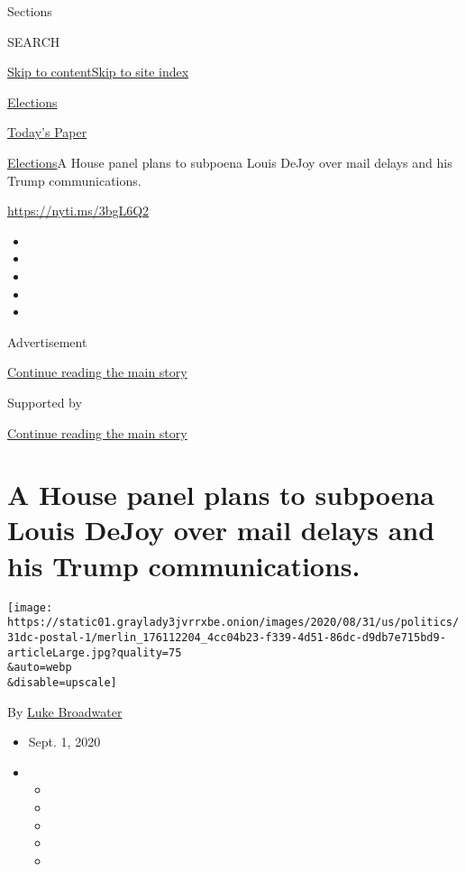 Sections

SEARCH

\protect\hyperlink{site-content}{Skip to
content}\protect\hyperlink{site-index}{Skip to site index}

\href{https://www.nytimes3xbfgragh.onion/news-event/2020-election}{Elections}

\href{https://myaccount.nytimes3xbfgragh.onion/auth/login?response_type=cookie\&client_id=vi}{}

\href{https://www.nytimes3xbfgragh.onion/section/todayspaper}{Today's
Paper}

\href{/news-event/2020-election}{Elections}\textbar{}A House panel plans
to subpoena Louis DeJoy over mail delays and his Trump communications.

\url{https://nyti.ms/3bgL6Q2}

\begin{itemize}
\item
\item
\item
\item
\item
\end{itemize}

Advertisement

\protect\hyperlink{after-top}{Continue reading the main story}

Supported by

\protect\hyperlink{after-sponsor}{Continue reading the main story}

\hypertarget{a-house-panel-plans-to-subpoena-louis-dejoy-over-mail-delays-and-his-trump-communications}{%
\section{A House panel plans to subpoena Louis DeJoy over mail delays
and his Trump
communications.}\label{a-house-panel-plans-to-subpoena-louis-dejoy-over-mail-delays-and-his-trump-communications}}

\texttt{[image: https://static01.graylady3jvrrxbe.onion/images/2020/08/31/us/politics/31dc-postal-1/merlin\_176112204\_4cc04b23-f339-4d51-86dc-d9db7e715bd9-articleLarge.jpg?quality=75\\\&auto=webp\\\&disable=upscale]}

By \href{https://www.nytimes3xbfgragh.onion/by/luke-broadwater}{Luke
Broadwater}

\begin{itemize}
\item
  Sept. 1, 2020
\item
  \begin{itemize}
  \item
  \item
  \item
  \item
  \item
  \end{itemize}
\end{itemize}

